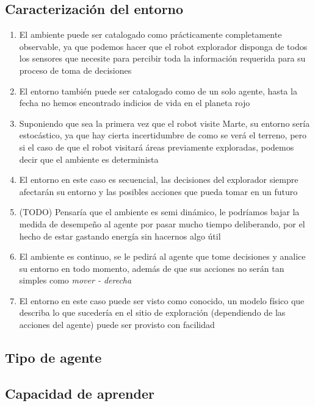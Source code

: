 \documentclass{article}
\begin{document}
        \subsection{Caracterización del entorno}
            \begin{enumerate}
                \item El ambiente puede ser catalogado como prácticamente completamente observable, ya que podemos hacer que el robot explorador disponga de todos los sensores que necesite para percibir toda la información requerida para su proceso de toma de decisiones
                \item El entorno también puede ser catalogado como de un solo agente, hasta la fecha no hemos encontrado indicios de vida en el planeta rojo
                \item Suponiendo que sea la primera vez que el robot visite Marte, su entorno sería estocástico, ya que hay cierta incertidumbre de como se verá el terreno, pero si el caso de que el robot visitará áreas previamente exploradas, podemos decir que el ambiente es determinista
                \item El entorno en este caso es secuencial, las decisiones del explorador siempre afectarán su entorno y las posibles acciones que pueda tomar en un futuro
                \item (TODO) Pensaría que el ambiente es semi dinámico, le podríamos bajar la medida de desempeño al agente por pasar mucho tiempo deliberando, por el hecho de estar gastando energía sin hacernos algo útil
                \item El ambiente es continuo, se le pedirá al agente que tome decisiones y analice su entorno en todo momento, además de que sus acciones no serán tan simples como \emph{mover - derecha}
                \item El entorno en este caso puede ser visto como conocido, un modelo físico que describa lo que sucedería en el sitio de exploración (dependiendo de las acciones del agente) puede ser provisto con facilidad
            \end{enumerate}

        \subsection{Tipo de agente}

        \subsection{Capacidad de aprender}
\end{document}
